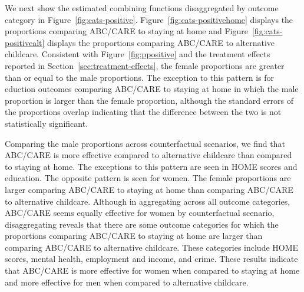 We next show the estimated combining functions disaggregated by outcome category in Figure~\ref{fig:cats-positive}. Figure~\ref{fig:cats-positivehome} displays the proportions comparing ABC/CARE to staying at home and Figure~\ref{fig:cats-positivealt} displays the proportions comparing ABC/CARE to alternative childcare. Consistent with Figure~\ref{fig:ppositive} and the treatment effects reported in Section~\ref{sec:treatment-effects}, the female proportions are greater than or equal to the male proportions. The exception to this pattern is for eduction outcomes comparing ABC/CARE to staying at home in which the male proportion is larger than the female proportion, although the standard errors of the proportions overlap indicating that the difference between the two is not statistically significant. 

Comparing the male proportions across counterfactual scenarios, we find that ABC/CARE is more effective compared to alternative childcare than compared to staying at home. The exceptions to this pattern are seen in HOME scores and education. The opposite pattern is seen for women. The female proportions are larger comparing ABC/CARE to staying at home than comparing ABC/CARE to alternative childcare. Although in aggregating across all outcome categories, ABC/CARE seems equally effective for women by counterfactual scenario, disaggregating reveals that there are some outcome categories for which the proportions comparing ABC/CARE to staying at home are larger than comparing ABC/CARE to alternative childcare. These categories include HOME scores, mental health, employment and income, and crime. These results indicate that ABC/CARE is more effective for women when compared to staying at home and more effective for men when compared to alternative childcare.


